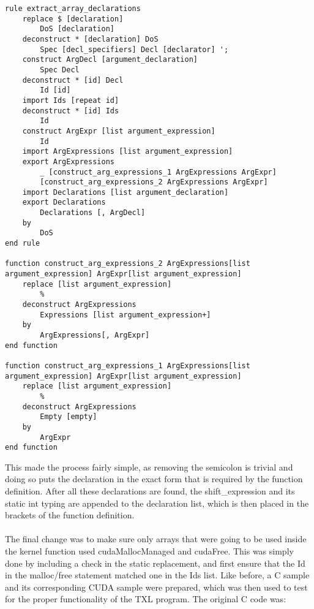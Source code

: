 \documentclass{article}
\begin{document}
\begin{lstlisting}
rule extract_array_declarations
    replace $ [declaration]
        DoS [declaration]
    deconstruct * [declaration] DoS
        Spec [decl_specifiers] Decl [declarator] ';
    construct ArgDecl [argument_declaration]
        Spec Decl
    deconstruct * [id] Decl
        Id [id]
    import Ids [repeat id]
    deconstruct * [id] Ids
        Id
    construct ArgExpr [list argument_expression]
        Id
    import ArgExpressions [list argument_expression]
    export ArgExpressions
		_ [construct_arg_expressions_1 ArgExpressions ArgExpr]
		[construct_arg_expressions_2 ArgExpressions ArgExpr]			
    import Declarations [list argument_declaration]
    export Declarations
        Declarations [, ArgDecl]
    by
        DoS
end rule

function construct_arg_expressions_2 ArgExpressions[list argument_expression] ArgExpr[list argument_expression]
	replace [list argument_expression]
		%
	deconstruct ArgExpressions
		Expressions [list argument_expression+]
	by
		ArgExpressions[, ArgExpr]
end function

function construct_arg_expressions_1 ArgExpressions[list argument_expression] ArgExpr[list argument_expression]
	replace [list argument_expression]
		%
	deconstruct ArgExpressions
		Empty [empty]
	by
		ArgExpr
end function
\end{lstlisting}

This made the process fairly simple, as removing the semicolon is trivial and doing so puts the declaration in the exact form that is required by the function definition. After all these declarations are found, the shift\_expression and its static int typing are appended to the declaration list, which is then placed in the brackets of the function definition.

\paragraph{}
The final change was to make sure only arrays that were going to be used inside the kernel function used cudaMallocManaged and cudaFree. This was simply done by including a check in the static replacement, and first ensure that the Id in the malloc/free statement matched one in the Ids list. Like before, a C sample and its corresponding CUDA sample were prepared, which was then used to test for the proper functionality of the TXL program. The original C code was:
\end{document}
